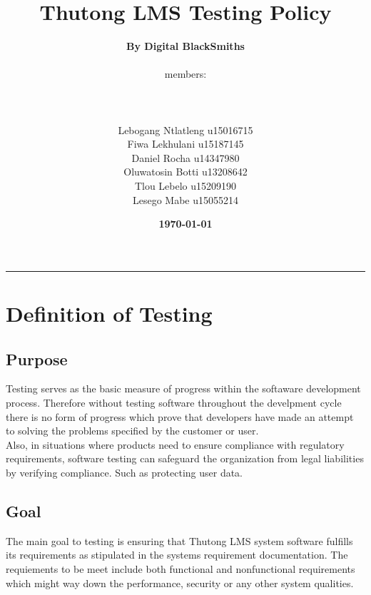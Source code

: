 \documentclass[a4paper,12pt]{article}
\begin{document}
\title{	{\Huge Thutong LMS Testing Policy}  }
\author{ \textbf{By Digital BlackSmiths}
	\\
	\\members:
	\\\noindent\rule{\textwidth}{1pt}
	\\Lebogang Ntlatleng	u15016715
	\\Fiwa Lekhulani	u15187145
	\\Daniel Rocha u14347980
	\\Oluwatosin Botti u13208642
	\\Tlou Lebelo u15209190
	\\Lesego Mabe	u15055214
}


\date{\textbf{\today}}
\maketitle
{}
\noindent\rule{\textwidth}{1pt}
\pagebreak
\tableofcontents
\newpage
{}

\section{Definition of Testing}

	\subsection{Purpose}
Testing serves as the basic measure of progress within the softaware development process. Therefore without testing software throughout the develpment cycle there is no form of progress which prove that developers have made an attempt to solving the problems specified by the customer or user. \\ 

Also, in situations where products need to ensure compliance with regulatory requirements, software testing can safeguard the organization from legal liabilities by verifying compliance. Such as protecting user data.

	\subsection{Goal}
The main goal to testing is ensuring that Thutong LMS system software fulfills its requirements as stipulated in the systems requirement documentation. The requiements to be meet include both functional and nonfunctional requirements which might way down the performance, security or any other system qualities.
\end{document}
